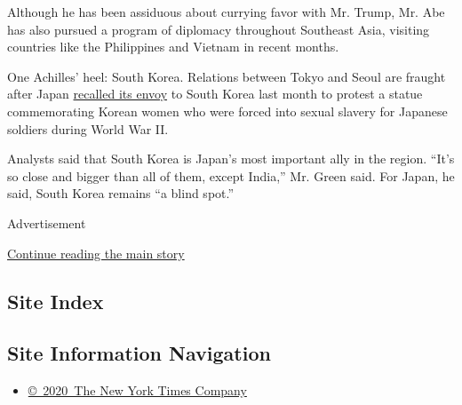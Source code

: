 Although he has been assiduous about currying favor with Mr. Trump, Mr.
Abe has also pursued a program of diplomacy throughout Southeast Asia,
visiting countries like the Philippines and Vietnam in recent months.

One Achilles' heel: South Korea. Relations between Tokyo and Seoul are
fraught after Japan
\href{https://www.nytimes.com/2017/01/06/world/asia/japan-south-korea-ambassador-comfort-woman-statue.html}{recalled
its envoy} to South Korea last month to protest a statue commemorating
Korean women who were forced into sexual slavery for Japanese soldiers
during World War II.

Analysts said that South Korea is Japan's most important ally in the
region. ``It's so close and bigger than all of them, except India,'' Mr.
Green said. For Japan, he said, South Korea remains ``a blind spot.''

Advertisement

\protect\hyperlink{after-bottom}{Continue reading the main story}

\hypertarget{site-index}{%
\subsection{Site Index}\label{site-index}}

\hypertarget{site-information-navigation}{%
\subsection{Site Information
Navigation}\label{site-information-navigation}}

\begin{itemize}
\tightlist
\item
  \href{https://help.nytimes.com/hc/en-us/articles/115014792127-Copyright-notice}{©~2020~The
  New York Times Company}
\end{itemize}

